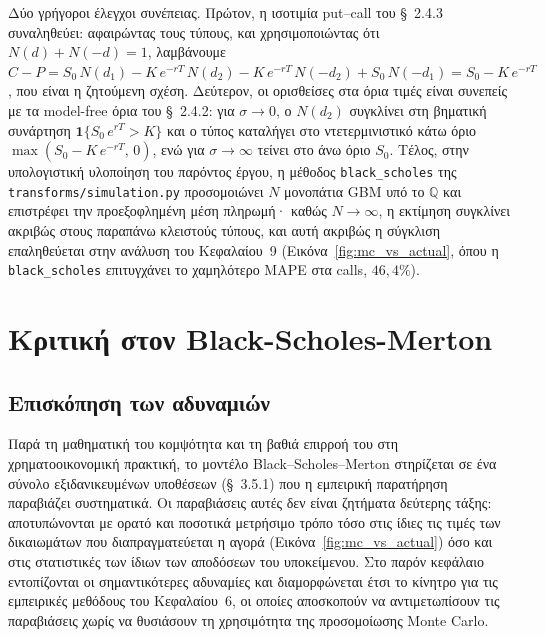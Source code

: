 \documentclass[12pt]{article}
\begin{document}
Δύο γρήγοροι έλεγχοι συνέπειας. Πρώτον, η ισοτιμία put–call του \S~2.4.3 συναληθεύει: αφαιρώντας τους τύπους, και χρησιμοποιώντας ότι $N(d) + N(-d) = 1$, λαμβάνουμε
$C - P = S_0\,N(d_1) - K\,e^{-rT}\,N(d_2) - K\,e^{-rT}\,N(-d_2) + S_0\,N(-d_1) = S_0 - K\,e^{-rT}$, που είναι η ζητούμενη σχέση. Δεύτερον, οι ορισθείσες στα όρια τιμές είναι συνεπείς με τα model-free όρια του \S~2.4.2: για $\sigma \to 0$, ο $N(d_2)$ συγκλίνει στη βηματική συνάρτηση $\mathbf{1}\{S_0\,e^{rT} > K\}$ και ο τύπος καταλήγει στο ντετερμινιστικό κάτω όριο $\max(S_0 - K\,e^{-rT},\,0)$, ενώ για $\sigma \to \infty$ τείνει στο άνω όριο $S_0$. Τέλος, στην υπολογιστική υλοποίηση του παρόντος έργου, η μέθοδος \texttt{black\_scholes} της \texttt{transforms/simulation.py} προσομοιώνει $N$ μονοπάτια GBM υπό το $\mathbb{Q}$ και επιστρέφει την προεξοφλημένη μέση πληρωμή· καθώς $N \to \infty$, η εκτίμηση συγκλίνει ακριβώς στους παραπάνω κλειστούς τύπους, και αυτή ακριβώς η σύγκλιση επαληθεύεται στην ανάλυση του Κεφαλαίου~9 (Εικόνα~\ref{fig:mc_vs_actual}, όπου η \texttt{black\_scholes} επιτυγχάνει το χαμηλότερο MAPE στα calls, $46{,}4\%$).

\newpage

\section{Κριτική στον Black-Scholes-Merton}
\subsection{Επισκόπηση των αδυναμιών}

Παρά τη μαθηματική του κομψότητα και τη βαθιά επιρροή του στη χρηματοοικονομική πρακτική, το μοντέλο Black–Scholes–Merton στηρίζεται σε ένα σύνολο εξιδανικευμένων υποθέσεων (\S~3.5.1) που η εμπειρική παρατήρηση παραβιάζει συστηματικά. Οι παραβιάσεις αυτές δεν είναι ζητήματα δεύτερης τάξης: αποτυπώνονται με ορατό και ποσοτικά μετρήσιμο τρόπο τόσο στις ίδιες τις τιμές των δικαιωμάτων που διαπραγματεύεται η αγορά (Εικόνα~\ref{fig:mc_vs_actual}) όσο και στις στατιστικές των ίδιων των αποδόσεων του υποκείμενου. Στο παρόν κεφάλαιο εντοπίζονται οι σημαντικότερες αδυναμίες και διαμορφώνεται έτσι το κίνητρο για τις εμπειρικές μεθόδους του Κεφαλαίου~6, οι οποίες αποσκοπούν να αντιμετωπίσουν τις παραβιάσεις χωρίς να θυσιάσουν τη χρησιμότητα της προσομοίωσης Monte Carlo.
\end{document}
